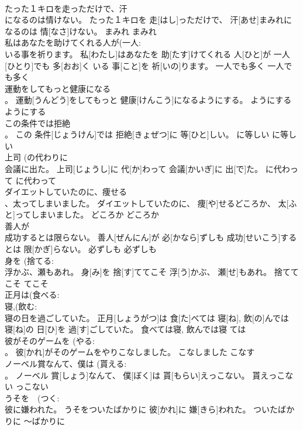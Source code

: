 \documentclass[8pt]{extreport}
\begin{document}
\begin{CJK}{UTF8}{min}
\\	たった１キロを走っただけで、汗 
\\	になるのは情けない。	たった１キロを 走[はし]っただけで、 汗[あせ]まみれになるのは 情[なさ]けない。	まみれ	まみれ	
\\	私はあなたを助けてくれる人が(一人: 
\\	いる事を祈ります。	私[わたし]はあなたを 助[たす]けてくれる 人[ひと]が 一人[ひとり]でも 多[おお]く いる 事[こと]を 祈[いの]ります。	一人でも多く	一人でも多く	
\\	運動をしてもっと健康になる 
\\	。	運動[うんどう]をしてもっと 健康[けんこう]になるようにする。	ようにする	ようにする	
\\	この条件では拒絶 
\\	。	この 条件[じょうけん]では 拒絶[きょぜつ]に 等[ひと]しい。	に等しい	に等しい	
\\	上司 (の代わりに 
\\	会議に出た。	上司[じょうし]に 代[か]わって 会議[かいぎ]に 出[で]た。	に代わって	に代わって	
\\	ダイエットしていたのに、痩せる 
\\	、太ってしまいました。	ダイエットしていたのに、 痩[や]せるどころか、 太[ふと]ってしまいました。	どころか	どころか	
\\	善人が 
\\	成功するとは限らない。	善人[ぜんにん]が 必[かなら]ずしも 成功[せいこう]するとは 限[かぎ]らない。	必ずしも	必ずしも	
\\	身を (捨てる: 
\\	浮かぶ、瀬もあれ。	身[み]を 捨[す]ててこそ 浮[う]かぶ、 瀬[せ]もあれ。	捨ててこそ	てこそ	
\\	正月は(食べる: 
\\	寝,(飲む: 
\\	寝の日を過ごしていた。	正月[しょうがつ]は 食[た]べては 寝[ね], 飲[の]んでは 寝[ね]の 日[ひ]を 過[す]ごしていた。	食べては寝, 飲んでは寝	ては	
\\	彼がそのゲームを (やる: 
\\	。	彼[かれ]がそのゲームをやりこなしました。	こなしました	こなす	
\\	ノーベル賞なんて、僕は (貰える: 
\\	。	ノーベル 賞[しょう]なんて、 僕[ぼく]は 貰[もらい]えっこない。	貰えっこない	っこない	
\\	うそを　(つく: 
\\	彼に嫌われた。	うそをついたばかりに 彼[かれ]に 嫌[きら]われた。	ついたばかりに	～ばかりに	

\end{CJK}
\end{document}
